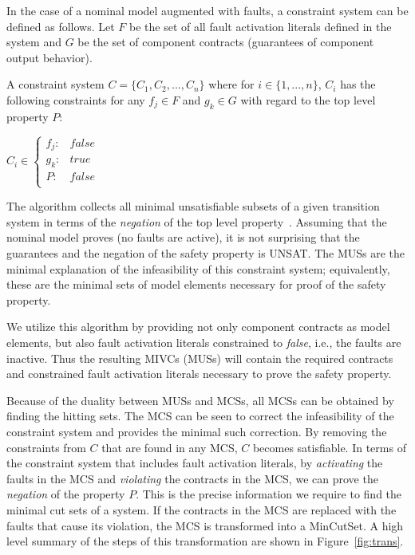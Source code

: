 In the case of a nominal model augmented with faults, a constraint system can be defined as follows. Let $F$ be the set of all fault activation literals defined in the system and $G$ be the set of component contracts (guarantees of component output behavior). 

\begin{definition}A constraint system $C = \{C_1,C_2,...,C_n\}$ where for $i \in \{1,...,n\}$, $C_i$ has the following constraints for any $f_j \in F$ and $g_k \in G$ with regard to the top level property $P$: 
\begin{center}
$C_i \in \left\{ \begin{array}{ll}
	f_j :&  false\\
	g_k :& true\\
	P :& false\\
\end{array}\right.$	
\end{center}
\label{def:constraintsystem}
\end{definition}

The \aivcalg algorithm collects all minimal unsatisfiable subsets of a given transition system in terms of the \textit{negation} of the top level property~\cite{Ghassabani2017EfficientGO,bendik2018online}. Assuming that the nominal model proves (no faults are active), it is not surprising that the guarantees and the negation of the safety property is UNSAT. The MUSs are the minimal explanation of the infeasibility of this constraint system; equivalently, these are the minimal sets of model elements necessary for proof of the safety property.

We utilize this algorithm by providing not only component contracts as model elements, but also fault activation literals constrained to \textit{false}, i.e., the faults are inactive. Thus the resulting MIVCs (MUSs) will contain the required contracts and constrained fault activation literals necessary to prove the safety property. 

Because of the duality between MUSs and MCSs, all MCSs can be obtained by finding the hitting sets. The MCS can be seen to correct the infeasibility of the constraint system and provides the minimal such correction. By removing the constraints from $C$ that are found in any MCS, $C$ becomes satisfiable. In terms of the constraint system that includes fault activation literals, by \textit{activating} the faults in the MCS and \textit{violating} the contracts in the MCS, we can prove the \textit{negation} of the property $P$. This is the precise information we require to find the minimal cut sets of a system. If the contracts in the MCS are replaced with the faults that cause its violation, the MCS is transformed into a MinCutSet. A high level summary of the steps of this transformation are shown in Figure~\ref{fig:trans}. 


